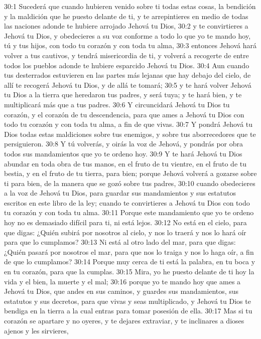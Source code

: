 30:1 Sucederá que cuando hubieren venido sobre ti todas estas cosas, la bendición y la maldición que he puesto delante de ti, y te arrepintieres en medio de todas las naciones adonde te hubiere arrojado Jehová tu Dios,  
30:2 y te convirtieres a Jehová tu Dios, y obedecieres a su voz conforme a todo lo que yo te mando hoy, tú y tus hijos, con todo tu corazón y con toda tu alma,  
30:3 entonces Jehová hará volver a tus cautivos, y tendrá misericordia de ti, y volverá a recogerte de entre todos los pueblos adonde te hubiere esparcido Jehová tu Dios.  
30:4 Aun cuando tus desterrados estuvieren en las partes más lejanas que hay debajo del cielo, de allí te recogerá Jehová tu Dios, y de allá te tomará;  
30:5 y te hará volver Jehová tu Dios a la tierra que heredaron tus padres, y será tuya; y te hará bien, y te multiplicará más que a tus padres.  
30:6 Y circuncidará Jehová tu Dios tu corazón, y el corazón de tu descendencia, para que ames a Jehová tu Dios con todo tu corazón y con toda tu alma, a fin de que vivas.  
30:7 Y pondrá Jehová tu Dios todas estas maldiciones sobre tus enemigos, y sobre tus aborrecedores que te persiguieron.  
30:8 Y tú volverás, y oirás la voz de Jehová, y pondrás por obra todos sus mandamientos que yo te ordeno hoy.  
30:9 Y te hará Jehová tu Dios abundar en toda obra de tus manos, en el fruto de tu vientre, en el fruto de tu bestia, y en el fruto de tu tierra, para bien; porque Jehová volverá a gozarse sobre ti para bien, de la manera que se gozó sobre tus padres,  
30:10 cuando obedecieres a la voz de Jehová tu Dios, para guardar sus mandamientos y sus estatutos escritos en este libro de la ley; cuando te convirtieres a Jehová tu Dios con todo tu corazón y con toda tu alma.  
30:11 Porque este mandamiento que yo te ordeno hoy no es demasiado difícil para ti, ni está lejos.  
30:12 No está en el cielo, para que digas: ¿Quién subirá por nosotros al cielo, y nos lo traerá y nos lo hará oír para que lo cumplamos?  
30:13 Ni está al otro lado del mar, para que digas: ¿Quién pasará por nosotros el mar, para que nos lo traiga y nos lo haga oír, a fin de que lo cumplamos?  
30:14 Porque muy cerca de ti está la palabra, en tu boca y en tu corazón, para que la cumplas. 
30:15 Mira, yo he puesto delante de ti hoy la vida y el bien, la muerte y el mal;  
30:16 porque yo te mando hoy que ames a Jehová tu Dios, que andes en sus caminos, y guardes sus mandamientos, sus estatutos y sus decretos, para que vivas y seas multiplicado, y Jehová tu Dios te bendiga en la tierra a la cual entras para tomar posesión de ella.  
30:17 Mas si tu corazón se apartare y no oyeres, y te dejares extraviar, y te inclinares a dioses ajenos y les sirvieres,  
